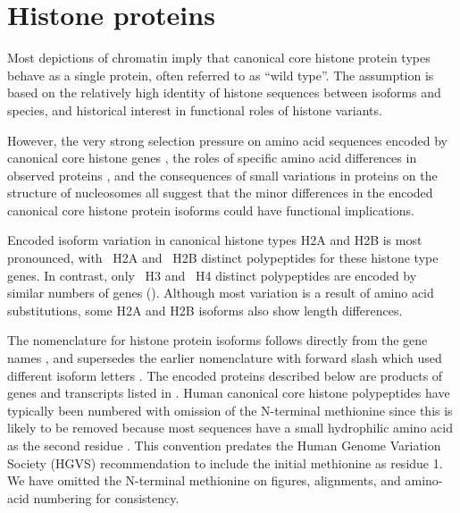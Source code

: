 \section{Histone proteins}
  Most depictions of chromatin imply that
  canonical core histone protein types behave as a single protein,
  often referred to as ``wild type''.
  The assumption is based on the relatively high identity of histone sequences
  between isoforms and species,
  and historical interest in functional roles of histone variants.

  However, the very strong selection pressure on
  amino acid sequences encoded by canonical core histone genes \citep{NeiRooney2005},
  the roles of specific amino acid differences in observed proteins \citep{MazeAllis2014},
  and the consequences of small variations in proteins on the structure of nucleosomes \citep{KurumizakaCOSB2013}
  all suggest that the minor differences in the encoded canonical core histone protein isoforms
  could have functional implications.

  Encoded isoform variation in canonical histone types H2A and H2B is most pronounced,
  with \HTwoAUniqueProteins{}~H2A and \HTwoBUniqueProteins{}~H2B distinct polypeptides
  for these histone type genes.
  In contrast, only \HThreeUniqueProteins{}~H3 and \HFourUniqueProteins{}~H4
  distinct polypeptides are encoded by similar numbers of genes ().
  Although most variation is a result of amino acid substitutions,
  some H2A and H2B isoforms also show length differences.

  The nomenclature for histone protein isoforms follows directly
  from the gene names \citep{Marzluff02},
  and supersedes the earlier nomenclature with forward slash which used different isoform letters
  \citep{AlbigGenomics1997,AlbigHumangen1997}.
  The encoded proteins described below are products of genes and transcripts listed
  in .
  Human canonical core histone polypeptides have typically been numbered
  with omission of the N-terminal methionine
  since this is likely to be removed because most sequences have
  a small hydrophilic amino acid as the second residue \citep{XiaoPeiBiochem2010}.
  This convention predates the Human Genome Variation Society (HGVS) recommendation
  to include the initial methionine as residue 1.
  We have omitted the N-terminal methionine on figures, alignments,
  and amino-acid numbering for consistency.


